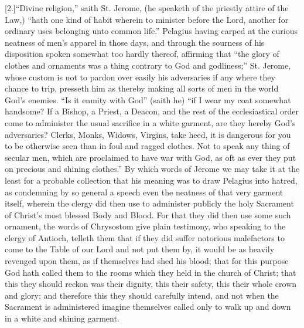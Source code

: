 [2.]“Divine religion,” saith St. Jerome, (he speaketh of the priestly attire of the Law,) “hath one kind of habit wherein to minister before the Lord, another for ordinary uses belonging unto common life.” Pelagius having carped at the curious neatness of men’s apparel in those days, and through the sourness of his disposition spoken somewhat too hardly thereof, affirming that “the glory of clothes and ornaments was a thing contrary to God and godliness;” St. Jerome, whose custom is not to pardon over easily his adversaries if any where they chance to trip, presseth him as thereby making all sorts of men in the world God’s enemies. “Is it enmity with God” (saith he) “if I wear my coat somewhat handsome? If a Bishop, a Priest, a Deacon, and the rest of the ecclesiastical order come to administer the usual sacrifice in a white garment, are they hereby God’s adversaries? Clerks, Monks, Widows, Virgins, take heed, it is dangerous for you to be otherwise seen than in foul and ragged clothes. Not to speak any thing of secular men, which are proclaimed to have war with God, as oft as ever they put on precious and shining clothes.” By which words of Jerome we may take it at the least for a probable collection that his meaning was to draw Pelagius into hatred, as condemning by so general a speech even the neatness of that very garment itself, wherein the clergy did then use to administer publicly the holy Sacrament of Christ’s most blessed Body and Blood. For that they did then use some such ornament, the words of Chrysostom give plain  testimony,
 who speaking to the clergy of Antioch, telleth them that if they did suffer notorious malefactors to come to the Table of our Lord and not put them by, it would be as heavily revenged upon them, as if themselves had shed his blood; that for this purpose God hath called them to the rooms which they held in the church of Christ; that this they should reckon was their dignity, this their safety, this their whole crown and glory; and therefore this they should carefully intend, and not when the Sacrament is administered imagine themselves called only to walk up and down in a white and shining garment.

